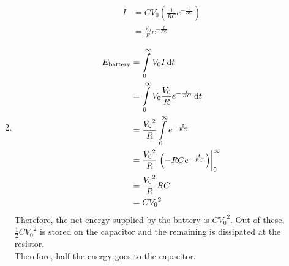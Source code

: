 \documentclass[fleqn, a4paper, 11pt, oneside]{amsart}
\theoremstyle{definition}
\theoremstyle{theorem}
\begin{document}
\begin{solution}
\begin{enumerate}[leftmargin = *]
\begin{align*}
				I &= C V_0 \left( \frac{1}{R C} e^{-\frac{t}{R C}} \right)\\
				&= \frac{V_0}{R} e^{-\frac{t}{R C}}
			\end{align*}
		\item
			\begin{align*}
				E_{\textnormal{battery}} &= \int\limits_{0}^{\infty} V_0 I \dif t\\
				&= \int\limits_{0}^{\infty} V_0 \frac{V_0}{R} e^{-\frac{t}{R C}} \dif t\\
				&= \frac{{V_0}^2}{R} \int\limits_{0}^{\infty} e^{-\frac{t}{R C}}\\
				&= \frac{{V_0}^2}{R} \left. \left( -R C e^{-\frac{t}{R C}} \right) \right|_{0}^{\infty}\\
				&= \frac{{V_0}^2}{R} R C\\
				&= C {V_0}^2
			\end{align*}
			Therefore, the net energy supplied by the battery is $C {V_0}^2$.
			Out of these, $\frac{1}{2} C {V_0}^2$ is stored on the capacitor and the remaining is dissipated at the resistor.\\
			Therefore, half the energy goes to the capacitor.
	\end{enumerate}
\end{solution}
\end{document}
